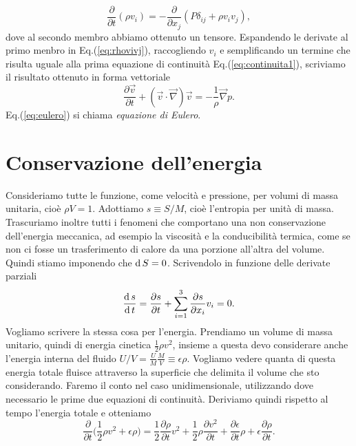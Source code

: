 \begin{equation}
    \frac{\partial}{\partial t} (\rho v_i) = - \frac{\partial}{\partial x_j}(P\delta_{ij} + \rho v_i v_j),
\end{equation}
dove al secondo membro abbiamo ottenuto un tensore. Espandendo le derivate al primo menbro in Eq.(\ref{eq:rhovivj}), raccogliendo $v_i$ e semplificando un termine che risulta uguale alla prima equazione di continuità Eq.(\ref{eq:continuita1}), scriviamo il risultato ottenuto in forma vettoriale
\begin{equation}
    \frac{\partial \vec{v}}{\partial t} + (\vec{v} \cdot \vec{\nabla}) \vec{v} = - \frac{1}{\rho} \vec{\nabla} p. \label{eq:eulero}
\end{equation}
Eq.(\ref{eq:eulero}) si chiama \emph{equazione di Eulero}.

\section{Conservazione dell'energia}
Consideriamo tutte le funzione, come velocità e pressione, per volumi di massa unitaria, cioè $\rho V = 1$. Adottiamo $s \equiv S / M$, cioè l'entropia per unità di massa. Trascuriamo inoltre tutti i fenomeni che comportano una non conservazione dell'energia meccanica, ad esempio la viscosità e la conducibilità termica, come se non ci fosse un trasferimento di calore da una porzione all'altra del volume. Quindi stiamo imponendo che $\operatorname{d} S = 0$. Scrivendolo in funzione delle derivate parziali
\begin{equation*}
    \frac{\operatorname{d} s}{\operatorname{d} t} = \frac{\partial s}{\partial t} + \sum_{i = 1}^3 \frac{\partial s}{\partial x_i} v_i = 0.
\end{equation*}
Vogliamo scrivere la stessa cosa per l'energia. Prendiamo un volume di massa unitario, quindi di energia cinetica $\frac{1}{2}\rho v^2$, insieme a questa devo considerare anche l'energia interna del fluido $U / V = \frac{U}{M} \frac{M}{V} \equiv \epsilon \rho$. Vogliamo vedere quanta di questa energia totale fluisce attraverso la superficie che delimita il volume che sto considerando. Faremo il conto nel caso unidimensionale, utilizzando dove necessario le prime due equazioni di continuità. Deriviamo quindi rispetto al tempo l'energia totale e otteniamo
\begin{equation}
    \frac{\partial}{\partial t}\biggl( \frac{1}{2}\rho v^2 + \epsilon \rho \biggr) = \frac{1}{2} \frac{\partial \rho}{\partial t} v^2 + \frac{1}{2}\rho \frac{\partial v^2}{\partial t} + \frac{\partial \epsilon}{\partial t} \rho + \epsilon \frac{\partial \rho}{\partial t}.\label{eq:continuita3}
\end{equation}
